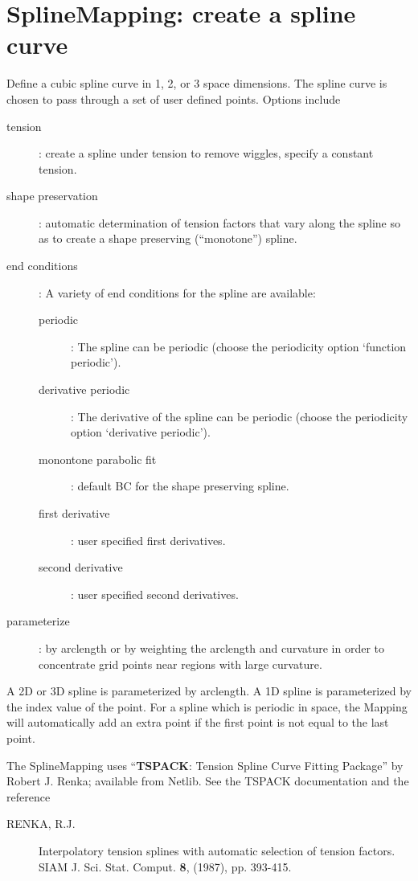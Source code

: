 \section{SplineMapping: create a spline curve} \label{sec:SplineMapping}

 Define a cubic spline curve in 1, 2, or 3 space dimensions.
The spline curve is chosen to pass through a set of user defined points.
Options include
\begin{description}
  \item[tension] : create a spline under tension to remove wiggles, specify a
     constant tension.
  \item[shape preservation] : automatic determination of tension factors that
     vary along the spline so as to create a shape preserving (``monotone'')
     spline.
  \item[end conditions] : A variety of end conditions for the spline are available:
    \begin{description}
      \item[periodic] : The spline can be periodic (choose the periodicity option `function periodic').
      \item[derivative periodic] : The derivative of the spline can be periodic
                (choose the periodicity option `derivative periodic').
      \item[monontone parabolic fit] : default BC for the shape preserving spline.
      \item[first derivative] : user specified first derivatives.
      \item[second derivative] : user specified second derivatives.
    \end{description}
  \item[parameterize] : by arclength or by weighting the arclength and curvature in order
     to concentrate grid points near regions with large curvature.
\end{description}

A 2D or 3D spline is parameterized by arclength. A 1D spline is parameterized
by the index value of the point.
For a spline which is periodic in space, the Mapping will automatically
add an extra point if the first point is not equal to the last point.

The SplineMapping uses ``{\bf TSPACK}: Tension Spline Curve Fitting Package''
by Robert J. Renka; available from Netlib. See the TSPACK documentation
and the reference 
\begin{description}
   \item[RENKA, R.J.] Interpolatory tension splines with automatic selection
   of tension factors. SIAM J. Sci. Stat. Comput. {\bf 8}, (1987), pp. 393-415.
\end{description}



